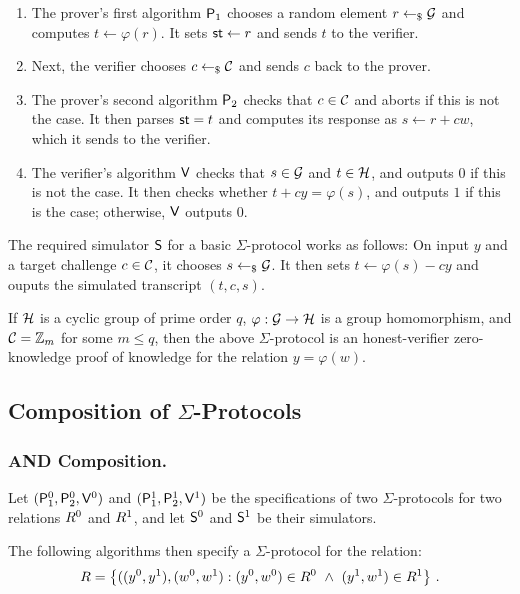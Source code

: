 \documentclass[runningheads]{llncs}
\begin{document}
\begin{enumerate}
  \item
    The prover's first algorithm $\mathsf{P}_1$ chooses a random element $r\gets_{\$}\mathcal{G}$ and computes $t\gets\varphi(r)$.
	It sets $\mathsf{st}\gets r$ and sends $t$ to the verifier.
  \item
    Next, the verifier chooses $c\gets_{\$}\mathcal{C}$ and sends $c$ back to the prover.
  \item
    The prover's second algorithm $\mathsf{P}_2$ checks that $c\in\mathcal{C}$ and aborts if this is not the case.
	It then parses $\mathsf{st}=t$ and computes its response as $s\gets r+cw$, which it sends to the verifier.
  \item
    The verifier's algorithm $\mathsf{V}$ checks that $s\in\mathcal{G}$ and $t\in\mathcal{H}$, and outputs $0$ if this is not the case.
	It then checks whether $t + cy = \varphi(s)$, and outputs $1$ if this is the case; otherwise, $\mathsf{V}$ outputs $0$.
\end{enumerate}

The required simulator $\mathsf{S}$ for a basic $\Sigma$-protocol works as follows:
On input $y$ and a target challenge $c\in\mathcal{C}$, it chooses $s\gets_{\$}\mathcal{G}$.
It then sets $t \gets \varphi(s) - cy$ and ouputs the simulated transcript $(t,c,s)$.

\begin{theorem}
  If $\mathcal{H}$ is a cyclic group of prime order $q$, $\varphi:\mathcal{G}\to\mathcal{H}$ is a group homomorphism, and $\mathcal{C}=\mathbb{Z}_m$ for some $m\leq q$, then the above $\Sigma$-protocol is an honest-verifier zero-knowledge proof of knowledge for the relation $y=\varphi(w)$.
\end{theorem}

\subsection{Composition of $\Sigma$-Protocols}
\subsubsection{AND Composition.}
  Let $(\mathsf{P}_1^0,\mathsf{P}_2^0,\mathsf{V}^0)$ and $(\mathsf{P}_1^1,\mathsf{P}_2^1,\mathsf{V}^1)$ be the specifications of two $\Sigma$-protocols for two relations $R^0$ and $R^1$, and let $\mathsf{S}^0$ and $\mathsf{S}^1$ be their simulators.

  The following algorithms then specify a $\Sigma$-protocol for the relation:
$$
  R = \left\{ ((y^0,y^1),(w^0,w^1) : (y^0,w^0)\in R^0 ~\land~ (y^1,w^1)\in R^1\right\}\,.
$$
  
\end{document}
